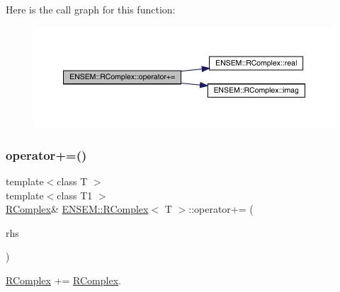 Here is the call graph for this function\+:
\nopagebreak
\begin{figure}[H]
\begin{center}
\leavevmode
\includegraphics[width=350pt]{d9/d0e/classENSEM_1_1RComplex_aca53957ad00d064844898e907e6f6fab_cgraph}
\end{center}
\end{figure}
\mbox{\label{classENSEM_1_1RComplex_aca53957ad00d064844898e907e6f6fab}} 
\subsubsection{\texorpdfstring{operator+=()}{operator+=()}\hspace{0.1cm}{\footnotesize\ttfamily [6/6]}}
{\footnotesize\ttfamily template$<$class T $>$ \\
template$<$class T1 $>$ \\
\mbox{\hyperlink{classENSEM_1_1RComplex}{R\+Complex}}\& \mbox{\hyperlink{classENSEM_1_1RComplex}{E\+N\+S\+E\+M\+::\+R\+Complex}}$<$ T $>$\+::operator+= (\begin{DoxyParamCaption}\item[{const \mbox{\hyperlink{classENSEM_1_1RComplex}{R\+Complex}}$<$ T1 $>$ \&}]{rhs }\end{DoxyParamCaption})\hspace{0.3cm}{\ttfamily [inline]}}



\mbox{\hyperlink{classENSEM_1_1RComplex}{R\+Complex}} += \mbox{\hyperlink{classENSEM_1_1RComplex}{R\+Complex}}. 

